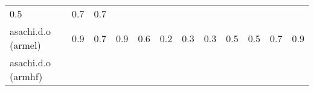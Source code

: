 \documentclass[parskip=half]{scrartcl}
\begin{document}
\begin{table}[h]
\begin{tabular}{@{}llllllllllll@{}}
\begin{minipage}[t]{0.05\columnwidth}
0.5\strut
\end{minipage} & \begin{minipage}[t]{0.05\columnwidth}\raggedright\strut
0.7\strut
\end{minipage} & \begin{minipage}[t]{0.05\columnwidth}\raggedright\strut
0.7\strut
\end{minipage}\tabularnewline
\begin{minipage}[t]{0.12\columnwidth}\raggedright\strut
asachi.d.o (armel)\strut
\end{minipage} & \begin{minipage}[t]{0.05\columnwidth}\raggedright\strut
0.9\strut
\end{minipage} & \begin{minipage}[t]{0.05\columnwidth}\raggedright\strut
0.7\strut
\end{minipage} & \begin{minipage}[t]{0.05\columnwidth}\raggedright\strut
0.9\strut
\end{minipage} & \begin{minipage}[t]{0.05\columnwidth}\raggedright\strut
0.6\strut
\end{minipage} & \begin{minipage}[t]{0.05\columnwidth}\raggedright\strut
0.2\strut
\end{minipage} & \begin{minipage}[t]{0.05\columnwidth}\raggedright\strut
0.3\strut
\end{minipage} & \begin{minipage}[t]{0.05\columnwidth}\raggedright\strut
0.3\strut
\end{minipage} & \begin{minipage}[t]{0.05\columnwidth}\raggedright\strut
0.5\strut
\end{minipage} & \begin{minipage}[t]{0.05\columnwidth}\raggedright\strut
0.5\strut
\end{minipage} & \begin{minipage}[t]{0.05\columnwidth}\raggedright\strut
0.7\strut
\end{minipage} & \begin{minipage}[t]{0.05\columnwidth}\raggedright\strut
0.9\strut
\end{minipage}\tabularnewline
\begin{minipage}[t]{0.12\columnwidth}\raggedright\strut
asachi.d.o (armhf)\strut
\end{minipage} & \begin{minipage}[t]{0.05\columnwidth}\raggedright\strut

\end{minipage}
\end{tabular}
\end{table}
\end{document}
